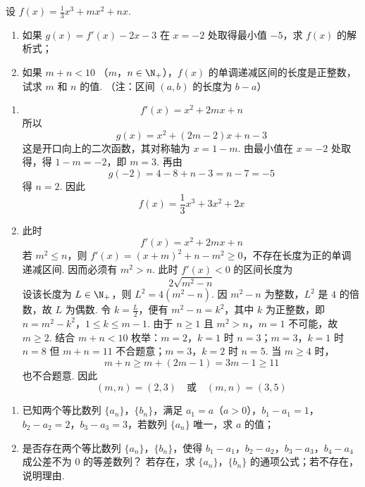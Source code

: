 \begin{problem}
设 \( f(x) = \frac{1}{3} x^3 + mx^2 + nx \).
\begin{enumerate}
\item 如果 \( g(x) = f'(x) - 2x - 3 \) 在 \( x = -2 \) 处取得最小值 \(-5\)，求 \( f(x) \) 的解析式；
\item 如果 \(m + n < 10\) （\(m\)，\(n \in \N_+\)），\(f(x)\) 的单调递减区间的长度是正整数，试求 \(m\) 和 \(n\) 的值. （注：区间 \((a, b)\) 的长度为 \(b - a\)）
\end{enumerate}
\end{problem}

\begin{solution}
\begin{enumerate}
\item
\[
f'(x)=x^2+2mx+n
\]
所以
\[
g(x)=x^2+(2m-2)x+n-3
\]
这是开口向上的二次函数，其对称轴为 \(x=1-m\). 由最小值在 \(x=-2\) 处取得，得 \(1-m=-2\)，即 \(m=3\). 再由
\[
g(-2)=4-8+n-3=n-7=-5
\]
得 \(n=2\). 因此
\[
f(x)=\frac13x^3+3x^2+2x
\]
\item 此时
\[
f'(x)=x^2+2mx+n
\]
若 \(m^2\le n\)，则 \(f'(x)=(x+m)^2+n-m^2\ge0\)，不存在长度为正的单调递减区间. 因而必须有 \(m^2>n\). 此时 \(f'(x)<0\) 的区间长度为
\[
2\sqrt{m^2-n}
\]
设该长度为 \(L\in\N_+\)，则 \(L^2=4(m^2-n)\). 因 \(m^2-n\) 为整数，\(L^2\) 是 \(4\) 的倍数，故 \(L\) 为偶数. 令 \(k=\frac{L}{2}\)，便有 \(m^2-n=k^2\)，其中 \(k\) 为正整数，即
\(n=m^2-k^2\)，\(1\le k\le m-1\).
由于 \(n\ge1\) 且 \(m^2>n\)，\(m=1\) 不可能，故 \(m\ge2\). 结合 \(m+n<10\) 枚举：\(m=2\)，\(k=1\) 时 \(n=3\)；\(m=3\)，\(k=1\) 时 \(n=8\) 但 \(m+n=11\) 不合题意；\(m=3\)，\(k=2\) 时 \(n=5\). 当 \(m\ge4\) 时，
\[
m+n\ge m+(2m-1)=3m-1\ge11
\]
也不合题意. 因此
\[
(m,n)=(2,3)\quad\text{或}\quad(m,n)=(3,5)
\]
\end{enumerate}
\end{solution}

\begin{problem}
\begin{enumerate}
\item 已知两个等比数列 \(\{a_{n}\}\)，\(\{b_{n}\}\)，满足 \(a_{1} = a\)（\(a > 0\)），\(b_{1} - a_{1} = 1\)，\(b_{2} - a_{2} = 2\)，\(b_{3} - a_{3} = 3\)，若数列 \(\{a_{n}\}\) 唯一，求 \(a\) 的值；
\item 是否存在两个等比数列 \(\{a_{n}\}\)，\(\{b_{n}\}\)，使得 \(b_{1} - a_{1}\)，\(b_{2} - a_{2}\)，\(b_{3} - a_{3}\)，\(b_{4} - a_{4}\) 成公差不为 0 的等差数列？ 若存在，求 \(\{a_{n}\}\)，\(\{b_{n}\}\) 的通项公式；若不存在，说明理由.
\end{enumerate}
\end{problem}

